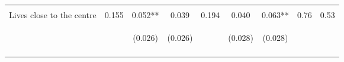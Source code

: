 \begin{tabular}{lcccccccc}
 & \begin{footnotesize}\end{footnotesize} & \begin{footnotesize}[0.017]\end{footnotesize} & \begin{footnotesize}[0.016]\end{footnotesize} & \begin{footnotesize}\end{footnotesize} & \begin{footnotesize}[0.505]\end{footnotesize} & \begin{footnotesize}[0.927]\end{footnotesize} & \begin{footnotesize}\end{footnotesize} & \begin{footnotesize}\end{footnotesize}\\
\noalign{\smallskip}Lives close to the centre & 0.155 & 0.052** & 0.039 & 0.194 & 0.040 & 0.063** & 0.76 & 0.53\\
 & \begin{footnotesize}\end{footnotesize} & \begin{footnotesize}(0.026)\end{footnotesize} & \begin{footnotesize}(0.026)\end{footnotesize} & \begin{footnotesize}\end{footnotesize} & \begin{footnotesize}(0.028)\end{footnotesize} & \begin{footnotesize}(0.028)\end{footnotesize} & \begin{footnotesize}\end{footnotesize} & \begin{footnotesize}\end{footnotesize}\\
 & \begin{footnotesize}\end{footnotesize} & \begin{footnotesize}[0.027]\end{footnotesize} & \begin{footnotesize}[0.034]\end{footnotesize} & \begin{footnotesize}\end{footnotesize} & \begin{footnotesize}[0.505]\end{footnotesize} & \begin{footnotesize}[0.136]\end{footnotesize} & \begin{footnotesize}\end{footnotesize} & \begin{footnotesize}\end{footnotesize}\\

\end{tabular}
